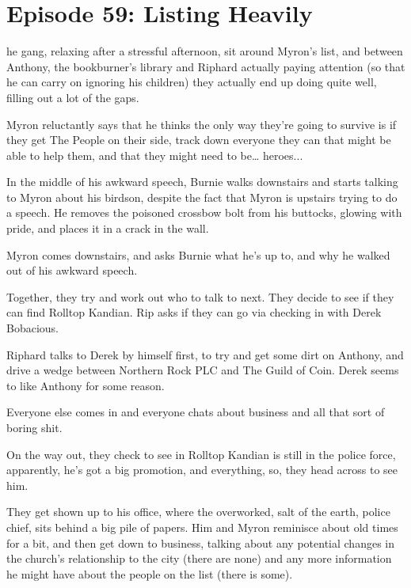 \section{Episode 59: Listing Heavily}

\medskip

he gang, relaxing after a stressful afternoon, sit around Myron’s list, and between Anthony, the bookburner’s library and Riphard actually paying attention (so that he can carry on ignoring his children) they actually end up doing quite well, filling out a lot of the gaps.\medskip

Myron reluctantly says that he thinks the only way they’re going to survive is if they get The People on their side, track down everyone they can that might be able to help them, and that they might need to be… heroes...\medskip

In the middle of his awkward speech, Burnie walks downstairs and starts talking to Myron about his birdson, despite the fact that Myron is upstairs trying to do a speech. He removes the poisoned crossbow bolt from his buttocks, glowing with pride, and places it in a crack in the wall.\medskip

Myron comes downstairs, and asks Burnie what he’s up to, and why he walked out of his awkward speech.\medskip

Together, they try and work out who to talk to next. They decide to see if they can find Rolltop Kandian. Rip asks if they can go via checking in with Derek Bobacious.\medskip

Riphard talks to Derek by himself first, to try and get some dirt on Anthony, and drive a wedge between Northern Rock PLC and The Guild of Coin. Derek seems to like Anthony for some reason.\medskip

Everyone else comes in and everyone chats about business and all that sort of boring shit.\medskip

On the way out, they check to see in Rolltop Kandian is still in the police force, apparently, he’s got a big promotion, and everything, so, they head across to see him.\medskip

They get shown up to his office, where the overworked, salt of the earth, police chief, sits behind a big pile of papers. Him and Myron reminisce about old times for a bit, and then get down to business, talking about any potential changes in the church’s relationship to the city (there are none) and any more information he might have about the people on the list (there is some).\medskip

